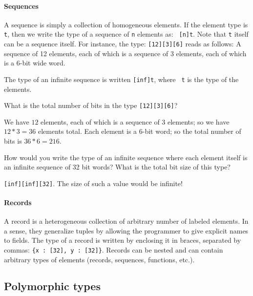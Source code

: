 \paragraph*{Sequences}\indTheSequenceType A sequence is simply a 
collection of homogeneous elements. If the element type is {\tt t},
then we write the type of a sequence of {\tt n} elements as: {\tt
  [n]t}.  Note that {\tt t} itself can be a sequence itself. For
instance, the type: {\tt [12][3][6]} reads as follows: A sequence of
12 elements, each of which is a sequence of 3 elements, each of which
is a 6-bit wide word.

The type of an infinite sequence is written {\tt [inf]t}, where {\tt
  t} is the type of the elements.\indInfSeq \indInf

\begin{Exercise}\label{ex:types:1}
What is the total number of bits in the type {\tt [12][3][6]}?
\end{Exercise}
\begin{Answer}
  We have $12$ elements, each of which is a sequence of $3$ elements;
  so we have $12*3=36$ elements total. Each element is a 6-bit word;
  so the total number of bits is $36*6 = 216$.
\end{Answer}

\begin{Exercise}\label{ex:types:2}
  How would you write the type of an infinite sequence where each
  element itself is an infinite sequence of 32 bit words? What is the
  total bit size of this type?
\end{Exercise}
\begin{Answer} {\tt [inf][inf][32]}. The size of
  such a value would be infinite!
\end{Answer}

\paragraph{Records}\indTheRecordType
A record is a heterogeneous collection of arbitrary number of labeled
elements.  In a sense, they generalize tuples by allowing the
programmer to give explicit names to fields. The type of a record is
written by enclosing it in braces, separated by commas: {\tt \{x :
  [32], y : [32]\}}. Records can be nested and can contain arbitrary
types of elements (records, sequences, functions, etc.).

\subsection{Polymorphic types}\indPolymorphism
\label{sec:polymorphic-types}

